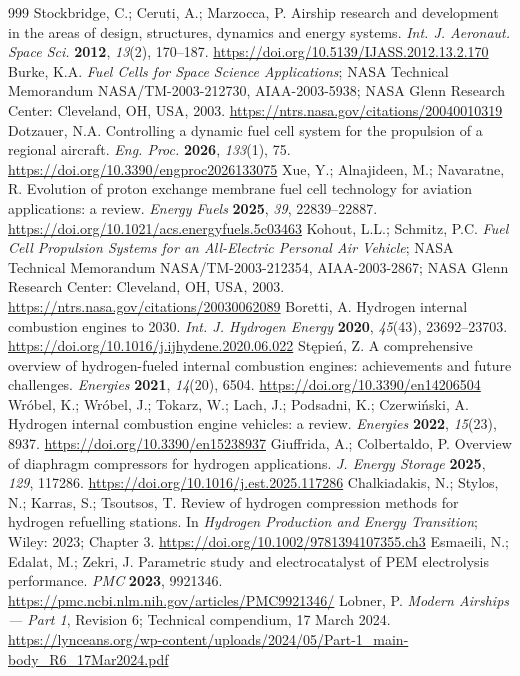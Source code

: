 \documentclass[applsci,article,submit,pdftex,moreauthors]{Definitions/mdpi}
\begin{document}
\begin{thebibliography}{999}
 Stockbridge, C.; Ceruti, A.; Marzocca, P. Airship research and development in the areas of design, structures, dynamics and energy systems. \textit{Int. J. Aeronaut. Space Sci.} \textbf{2012}, \textit{13}(2), 170--187. \url{https://doi.org/10.5139/IJASS.2012.13.2.170}
 Burke, K.A. \textit{Fuel Cells for Space Science Applications}; NASA Technical Memorandum NASA/TM-2003-212730, AIAA-2003-5938; NASA Glenn Research Center: Cleveland, OH, USA, 2003. \url{https://ntrs.nasa.gov/citations/20040010319}
 Dotzauer, N.A. Controlling a dynamic fuel cell system for the propulsion of a regional aircraft. \textit{Eng. Proc.} \textbf{2026}, \textit{133}(1), 75. \url{https://doi.org/10.3390/engproc2026133075}
 Xue, Y.; Alnajideen, M.; Navaratne, R. Evolution of proton exchange membrane fuel cell technology for aviation applications: a review. \textit{Energy Fuels} \textbf{2025}, \textit{39}, 22839--22887. \url{https://doi.org/10.1021/acs.energyfuels.5c03463}
 Kohout, L.L.; Schmitz, P.C. \textit{Fuel Cell Propulsion Systems for an All-Electric Personal Air Vehicle}; NASA Technical Memorandum NASA/TM-2003-212354, AIAA-2003-2867; NASA Glenn Research Center: Cleveland, OH, USA, 2003. \url{https://ntrs.nasa.gov/citations/20030062089}
 Boretti, A. Hydrogen internal combustion engines to 2030. \textit{Int. J. Hydrogen Energy} \textbf{2020}, \textit{45}(43), 23692--23703. \url{https://doi.org/10.1016/j.ijhydene.2020.06.022}
 Stępień, Z. A comprehensive overview of hydrogen-fueled internal combustion engines: achievements and future challenges. \textit{Energies} \textbf{2021}, \textit{14}(20), 6504. \url{https://doi.org/10.3390/en14206504}
 Wróbel, K.; Wróbel, J.; Tokarz, W.; Lach, J.; Podsadni, K.; Czerwiński, A. Hydrogen internal combustion engine vehicles: a review. \textit{Energies} \textbf{2022}, \textit{15}(23), 8937. \url{https://doi.org/10.3390/en15238937}
 Giuffrida, A.; Colbertaldo, P. Overview of diaphragm compressors for hydrogen applications. \textit{J. Energy Storage} \textbf{2025}, \textit{129}, 117286. \url{https://doi.org/10.1016/j.est.2025.117286}
 Chalkiadakis, N.; Stylos, N.; Karras, S.; Tsoutsos, T. Review of hydrogen compression methods for hydrogen refuelling stations. In \textit{Hydrogen Production and Energy Transition}; Wiley: 2023; Chapter 3. \url{https://doi.org/10.1002/9781394107355.ch3}
 Esmaeili, N.; Edalat, M.; Zekri, J. Parametric study and electrocatalyst of PEM electrolysis performance. \textit{PMC} \textbf{2023}, 9921346. \url{https://pmc.ncbi.nlm.nih.gov/articles/PMC9921346/}
 Lobner, P. \textit{Modern Airships --- Part 1}, Revision 6; Technical compendium, 17 March 2024. \url{https://lynceans.org/wp-content/uploads/2024/05/Part-1_main-body_R6_17Mar2024.pdf}
\end{thebibliography}
\end{document}
